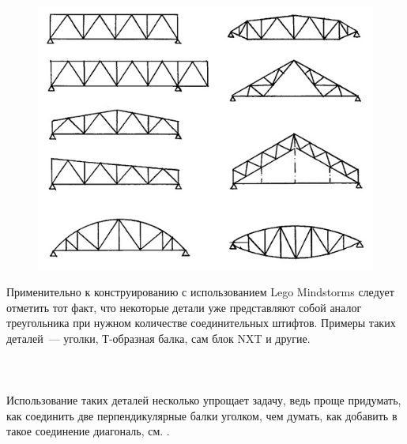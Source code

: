 \\\\
\clearpage
\begin{figure}[h!]
	\begin{center}
		\includegraphics[width=1\linewidth]{chapters/chapter19/images/2}
		\caption{}
		\label{ris:image19x2}
	\end{center}
\end{figure}

Применительно к конструированию с использованием Lego Mindstorms следует отметить тот факт, что некоторые детали уже представляют собой аналог треугольника при нужном количестве соединительных штифтов. Примеры таких деталей~--- уголки, Т-образная балка, сам блок NXT и другие.\\\\

\\\\

Использование таких деталей несколько упрощает задачу, ведь проще придумать, как соединить две перпендикулярные балки уголком, чем думать, как добавить в такое соединение диагональ, см. .\\\\

\\\\

